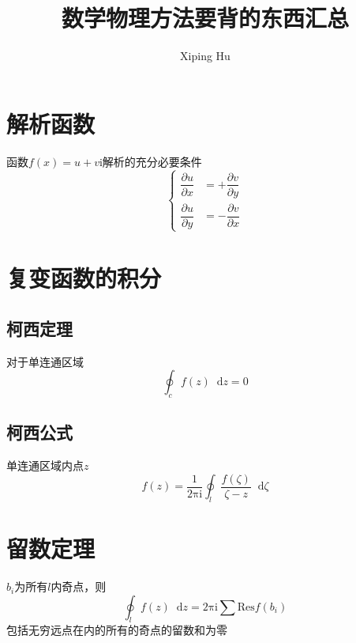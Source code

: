 \documentclass{article}
\author{Xiping Hu}
\title{数学物理方法要背的东西汇总}
\newcommand*{\md}{\mathop{}\!\mathrm{d}}
\begin{document}
\maketitle

\section{解析函数}

函数$f(x) = u + v \mathrm{i}$解析的充分必要条件
\begin{equation*}
  \left\{
  \begin{aligned}
    \dfrac{\partial u}{\partial x} &= + \dfrac{\partial v}{\partial y} \\
    \dfrac{\partial u}{\partial y} &= - \dfrac{\partial v}{\partial x} 
  \end{aligned}
  \right.
\end{equation*}

\section{复变函数的积分}

\subsection{柯西定理}
对于单连通区域
\begin{equation*}
  \oint_{c} f(z) \md z = 0
\end{equation*}

\subsection{柯西公式}

单连通区域内点$z$
\begin{equation*}
  f(z) = \dfrac{1}{2 \mathrm{\pi} \mathrm{i}} \oint_{l} \dfrac{f(\zeta)}{\zeta - z} \md \zeta
\end{equation*}

\section{留数定理}

$b_{i}$为所有$l$内奇点，则
\begin{equation*}
  \oint_{l} f(z) \md z = 2 \mathrm{\pi} \mathrm{i} \sum\limits \mathrm{Res}f(b_{i})
\end{equation*}
包括无穷远点在内的所有的奇点的留数和为零
\end{document}
